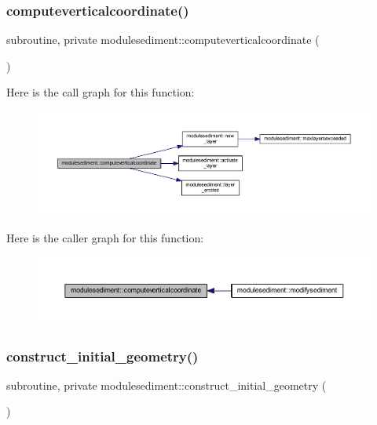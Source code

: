\subsubsection{\texorpdfstring{computeverticalcoordinate()}{computeverticalcoordinate()}}
{\footnotesize\ttfamily subroutine, private modulesediment\+::computeverticalcoordinate (\begin{DoxyParamCaption}{ }\end{DoxyParamCaption})\hspace{0.3cm}{\ttfamily [private]}}

Here is the call graph for this function\+:\nopagebreak
\begin{figure}[H]
\begin{center}
\leavevmode
\includegraphics[width=350pt]{namespacemodulesediment_ae2d0c9fdf078f2fd81047486eb734a9d_cgraph}
\end{center}
\end{figure}
Here is the caller graph for this function\+:\nopagebreak
\begin{figure}[H]
\begin{center}
\leavevmode
\includegraphics[width=350pt]{namespacemodulesediment_ae2d0c9fdf078f2fd81047486eb734a9d_icgraph}
\end{center}
\end{figure}
\mbox{\label{namespacemodulesediment_adb9b138d3feb285796bc8580b24509db}} 
\subsubsection{\texorpdfstring{construct\+\_\+initial\+\_\+geometry()}{construct\_initial\_geometry()}}
{\footnotesize\ttfamily subroutine, private modulesediment\+::construct\+\_\+initial\+\_\+geometry (\begin{DoxyParamCaption}{ }\end{DoxyParamCaption})\hspace{0.3cm}{\ttfamily [private]}}

